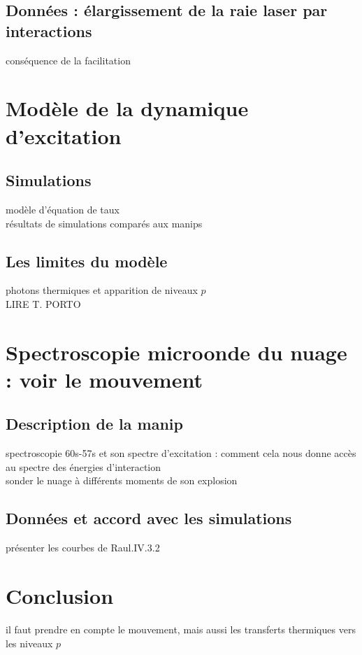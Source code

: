 	\subsection{Données : élargissement de la raie laser par interactions}
		\noindent conséquence de la facilitation
		
\section{Modèle de la dynamique d'excitation}
	\subsection{Simulations}
		\noindent modèle d'équation de taux\\
		\noindent résultats de simulations comparés aux manips\\
	\subsection{Les limites du modèle}
		\noindent photons thermiques et apparition de niveaux $p$ \\
		LIRE T. PORTO
		
\section{Spectroscopie microonde du nuage : voir le mouvement}
	\subsection{Description de la manip}
		\noindent spectroscopie 60s-57s et son spectre d'excitation : comment cela nous donne accès au spectre des énergies d'interaction\\
		sonder le nuage à différents moments de son explosion
	\subsection{Données et accord avec les simulations}
		\noindent présenter les courbes de Raul.IV.3.2
		

\section*{Conclusion}
		\noindent il faut prendre en compte le mouvement, mais aussi les transferts thermiques vers les niveaux $p$
		
